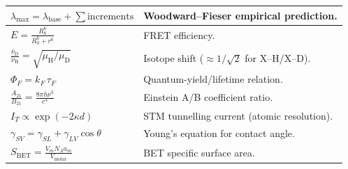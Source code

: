 \documentclass[12pt,a4paper]{article}
\begin{document}
\begin{tcolorbox}[formulabox, breakable, title={Key Formulas at a Glance},
  title after break={\textbf{Key Formulas at a Glance (contd.)}}]
\begin{tabularx}{\linewidth}{|B{4.4cm}|Y|}
\hline
$\lambda_{\max} = \lambda_{\mathrm{base}} + \sum \text{increments}$ & Woodward--Fieser empirical prediction. \\
\hline
$E = \displaystyle\frac{R_0^{6}}{R_0^{6}+r^{6}}$ & FRET efficiency. \\
\hline
$\displaystyle\frac{\bar{\nu}_{\mathrm{D}}}{\bar{\nu}_{\mathrm{H}}} = \sqrt{\mu_{\mathrm{H}}/\mu_{\mathrm{D}}}$ & Isotope shift ($\approx 1/\sqrt{2}$ for X--H/X--D). \\
\hline
$\Phi_F = k_F\,\tau_F$ & Quantum-yield/lifetime relation. \\
\hline
$\displaystyle\frac{A_{21}}{B_{21}}=\frac{8\pi h\nu^{3}}{c^{3}}$ & Einstein A/B coefficient ratio. \\
\hline
$I_T \propto \exp(-2\kappa d)$ & STM tunnelling current (atomic resolution). \\
\hline
$\gamma_{SV}=\gamma_{SL}+\gamma_{LV}\cos\theta$ & Young's equation for contact angle. \\
\hline
$S_{\mathrm{BET}}=\displaystyle\frac{V_m N_A a_m}{V_{\mathrm{molar}}}$ & BET specific surface area. \\
\hline
\end{tabularx}
\end{tcolorbox}
\end{document}
